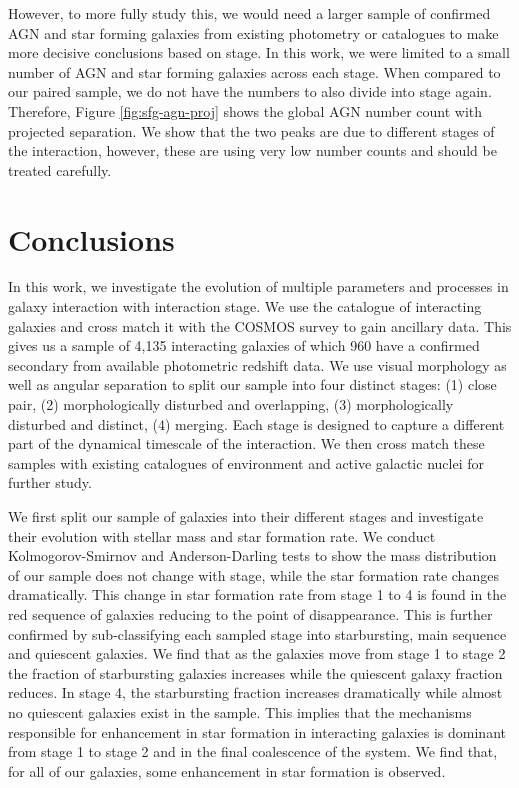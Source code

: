 However, to more fully study this, we would need a larger sample of confirmed AGN and star forming galaxies from existing photometry or catalogues to make more decisive conclusions based on stage. In this work, we were limited to a small number of AGN and star forming galaxies across each stage. When compared to our paired sample, we do not have the numbers to also divide into stage again. Therefore, Figure \ref{fig:sfg-agn-proj} shows the global AGN number count with projected separation. We show that the two peaks are due to different stages of the interaction, however, these are using very low number counts and should be treated carefully.
 
\section{Conclusions}\label{conclusion}
\noindent In this work, we investigate the evolution of multiple parameters and processes in galaxy interaction with interaction stage. We use the \citet{2023ApJ...948...40O} catalogue of interacting galaxies and cross match it with the COSMOS survey to gain ancillary data. This gives us a sample of 4,135 interacting galaxies of which 960 have a confirmed secondary from available photometric redshift data. We use visual morphology as well as angular separation to split our sample into four distinct stages: (1) close pair, (2) morphologically disturbed and overlapping, (3) morphologically disturbed and distinct, (4) merging. Each stage is designed to capture a different part of the dynamical timescale of the interaction. We then cross match these samples with existing catalogues of environment and active galactic nuclei for further study.

We first split our sample of galaxies into their different stages and investigate their evolution with stellar mass and star formation rate. We conduct Kolmogorov-Smirnov and Anderson-Darling tests to show the mass distribution of our sample does not change with stage, while the star formation rate changes dramatically. This change in star formation rate from stage 1 to 4 is found in the red sequence of galaxies reducing to the point of disappearance. This is further confirmed by sub-classifying each sampled stage into starbursting, main sequence and quiescent galaxies. We find that as the galaxies move from stage 1 to stage 2 the fraction of starbursting galaxies increases while the quiescent galaxy fraction reduces. In stage 4, the starbursting fraction increases dramatically while almost no quiescent galaxies exist in the sample. This implies that the mechanisms responsible for enhancement in star formation in interacting galaxies is dominant from stage 1 to stage 2 and in the final coalescence of the system. We find that, for all of our galaxies, some enhancement in star formation is observed. 

